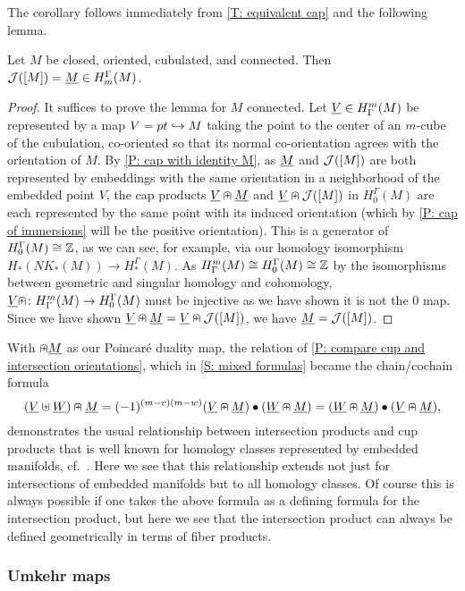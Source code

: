 The corollary follows immediately from \cref{T: equivalent cap} and the following lemma.

\begin{lemma}
	Let $M$ be closed, oriented, cubulated, and connected.
	Then $\mathcal{J}([M]) = \underline{M} \in H_m^\Gamma(M)$.
\end{lemma}

\begin{proof}
	It suffices to prove the lemma for $M$ connected.
	Let $\underline{V} \in H^m_\Gamma(M)$ be represented by a map $V = pt \hookrightarrow M$ taking the point to the center of an $m$-cube of the cubulation, co-oriented so that its normal co-orientation agrees with the orientation of $M$.
	By \cref{P: cap with identity M}, as $\underline{M}$ and $\mathcal{J}([M])$ are both represented by embeddings with the same orientation in a neighborhood of the embedded point $V$, the cap products $\underline{V}\nplus \underline{M}$ and $\underline{V}\nplus \mathcal{J}([M])$ in $H_0^\Gamma(M)$ are each represented by the same point with its induced orientation (which by \cref{P: cap of immersions} will be the positive orientation).
	This is a generator of $H_0^\Gamma(M) \cong \mathbb{Z}$, as we can see, for example, via our homology isomorphism $H_*(NK_*(M)) \to H_*^\Gamma(M)$.
	As $H^m_\Gamma(M) \cong H_0^\Gamma(M) \cong \mathbb{Z}$ by the isomorphisms between geometric and singular homology and cohomology, $\underline{V}\nplus \colon H^m_\Gamma(M) \to H_0^\Gamma(M)$ must be injective as we have shown it is not the $0$ map.
	Since we have shown $\underline{V}\nplus\underline{M} = \underline{V}\nplus\mathcal{J}([M])$, we have $\underline{M} = \mathcal{J}([M])$.
\end{proof}

With $\nplus \underline{M}$ as our Poincar\'e duality map, the relation of \cref{P: compare cup and intersection orientations}, which in \cref{S: mixed formulas} became the chain/cochain formula
$$(\underline{V}\uplus \underline{W})\nplus \underline{M} = (-1)^{(m-v)(m-w)}(\underline{V}\nplus \underline{M})\bullet(\underline{W}\nplus \underline{M}) = (\underline{W}\nplus \underline{M})\bullet(\underline{V}\nplus \underline{M}),$$
demonstrates the usual relationship between intersection products and cup products that is well known for homology classes represented by embedded manifolds, cf.\ \cite[Section VI.11]{Bred97}.
Here we see that this relationship extends not just for intersections of embedded manifolds but to all homology classes.
Of course this is always possible if one takes the above formula as a defining formula for the intersection product, but here we see that the intersection product can always be defined geometrically in terms of fiber products.

\subsubsection{Umkehr maps}

